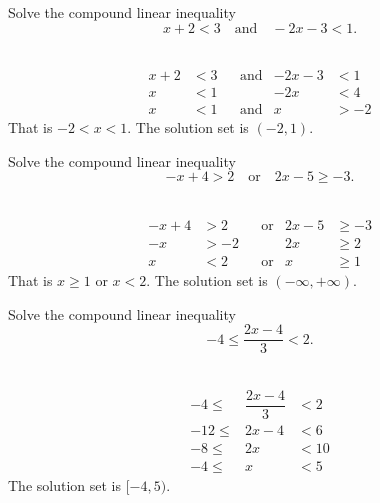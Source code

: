\documentclass[en,11pt]{elegantbook}
\let\BeginKnitrBlock\begin \let\EndKnitrBlock\end
\begin{document}
\BeginKnitrBlock{example}
\protect\hypertarget{exm:unnamed-chunk-197}{}{\label{exm:unnamed-chunk-197} }
Solve the compound linear inequality
\[
x+2<3\quad \text{and}\quad -2x-3<1.
\]
\EndKnitrBlock{example}

\BeginKnitrBlock{solution}
{}\\

\[
\begin{aligned}
    x+2 & <3 &  & \text{and} & -2x-3 & <1  \\
    x   & <1 &  &            & -2x   & <4  \\
    x   & <1 &  & \text{and} & x     & >-2
\end{aligned}
\]
That is \(-2<x<1\). The solution set is \((-2, 1)\).
\EndKnitrBlock{solution}

\BeginKnitrBlock{example}
\protect\hypertarget{exm:unnamed-chunk-199}{}{\label{exm:unnamed-chunk-199} }
Solve the compound linear inequality\\
\[
-x+4>2 \quad \text{or} \quad 2x-5\geq -3.
\]
\EndKnitrBlock{example}

\BeginKnitrBlock{solution}
{}\\

\[
\begin{aligned}
    -x+4 & >2  &  & \text{or} & 2x-5 & \geq -3 \\
    -x   & >-2 &  &           & 2x   & \geq 2  \\
    x    & <2  &  & \text{or} & x    & \geq 1
\end{aligned}
\]
That is \(x\geq 1\) or \(x< 2\). The solution set is \((-\infty, +\infty)\).
\EndKnitrBlock{solution}

\BeginKnitrBlock{example}
\protect\hypertarget{exm:unnamed-chunk-201}{}{\label{exm:unnamed-chunk-201} }
Solve the compound linear inequality
\[
-4\leq\dfrac{2x-4}{3}<2.
\]
\EndKnitrBlock{example}

\BeginKnitrBlock{solution}
{}\\

\[
\begin{array}{rcl}
    -4\leq  & \dfrac{2x-4}{3}    & <2  \\
    -12\leq & 2x-4         & <6  \\
    -8\leq  & 2x                & <10 \\
    -4\leq  & x               & <5  
\end{array}
\]
The solution set is \([-4, 5)\).
\EndKnitrBlock{solution}
\end{document}
